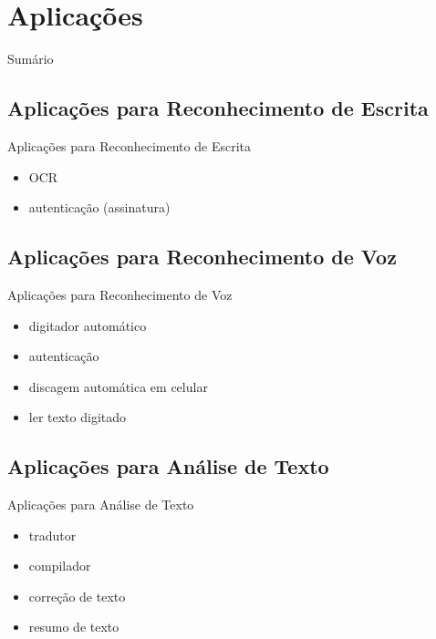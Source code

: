 \renewcommand{\titulo}{Aplicações}
\section{\titulo}

\begin{frame}{Sumário}
\tableofcontents[currentsection]
\end{frame}

\renewcommand{\titulo}{Aplicações para Reconhecimento de Escrita}
\subsection{\titulo}
\begin{frame}{\titulo}
\begin{itemize}
\item OCR
\item autenticação (assinatura)
\end{itemize}
\end{frame}

\renewcommand{\titulo}{Aplicações para Reconhecimento de Voz}
\subsection{\titulo}
\begin{frame}{\titulo}
\begin{itemize}
\item digitador automático
\item autenticação
\item discagem automática em celular
\item ler texto digitado
\end{itemize}
\end{frame}

\renewcommand{\titulo}{Aplicações para Análise de Texto}
\subsection{\titulo}
\begin{frame}{\titulo}
\begin{itemize}
\item tradutor
\item compilador
\item correção de texto
\item resumo de texto
\end{itemize}
\end{frame}


